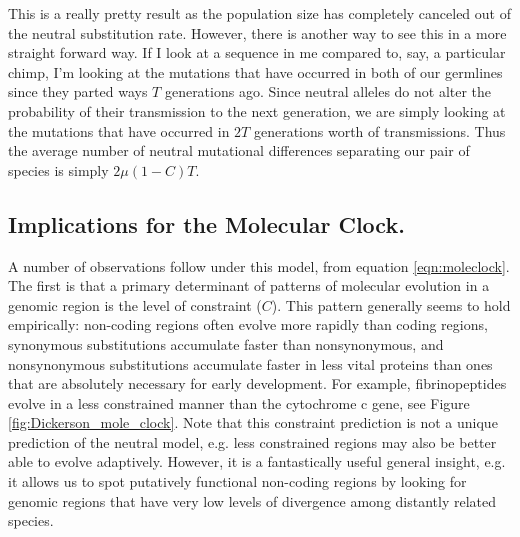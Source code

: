 This is a really pretty result as the population size has completely canceled
out of the neutral substitution rate. However, there is another way to see this
in a more straight forward way. If I look at a sequence in me compared to, say, a
particular chimp, I'm looking at the mutations that have occurred in both of
our germlines since they parted ways $T$ generations ago. Since neutral alleles
do not alter the probability of their transmission to the next generation, we
are simply looking at the mutations that have occurred in $2T$ generations
worth of transmissions. Thus the average number of neutral mutational
differences separating our pair of species is simply $2\mu (1-C) T$.\\

\subsection{Implications for the Molecular Clock.}
A number of observations follow under this model, from equation
\eqref{eqn:moleclock}. The first is that a primary determinant of
patterns of molecular evolution in a genomic region is the level of
constraint ($C$). This pattern generally seems to hold empirically:
non-coding regions often evolve more rapidly than coding regions,
synonymous substitutions accumulate faster than nonsynonymous, and
nonsynonymous substitutions accumulate faster in less vital proteins
than ones that are absolutely necessary for early development. For
example, fibrinopeptides evolve in a less constrained manner than the
cytochrome c gene, see Figure \ref{fig:Dickerson_mole_clock}. Note
that this constraint prediction is not a unique prediction of the neutral model, e.g. less constrained regions may also be better able to evolve adaptively. However, it is a fantastically useful general insight, e.g. it allows us to spot putatively functional non-coding regions by looking for genomic regions that have very low levels of divergence among distantly related species.

